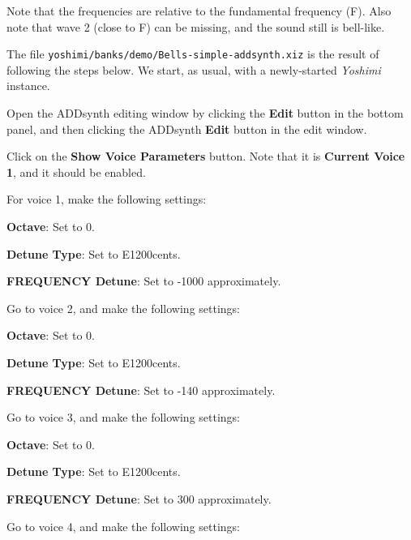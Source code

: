    Note that the frequencies are relative to the fundamental frequency (F).
   Also note that wave 2 (close to F) can be missing, and the sound still is
   bell-like.

   The file \texttt{yoshimi/banks/demo/Bells-simple-addsynth.xiz} is the
   result of following the steps below.  We start, as usual, with a
   newly-started \textsl{Yoshimi} instance.

   \begin{enumber}
      \item Open the ADDsynth editing window by clicking the \textbf{Edit}
         button in the bottom panel, and then clicking the ADDsynth
         \textbf{Edit} button in the edit window.
      \item Click on the \textbf{Show Voice Parameters} button.
         Note that it is \textbf{Current Voice 1}, and it should be enabled.
      \item For voice 1, make the following settings:
         \begin{enumber}
            \item \textbf{Octave}: Set to 0.
            \item \textbf{Detune Type}: Set to E1200cents.
            \item \textbf{FREQUENCY Detune}: Set to -1000 approximately.
         \end{enumber}
      \item Go to voice 2, and make the following settings:
         \begin{enumber}
            \item \textbf{Octave}: Set to 0.
            \item \textbf{Detune Type}: Set to E1200cents.
            \item \textbf{FREQUENCY Detune}: Set to -140 approximately.
         \end{enumber}
      \item Go to voice 3, and make the following settings:
         \begin{enumber}
            \item \textbf{Octave}: Set to 0.
            \item \textbf{Detune Type}: Set to E1200cents.
            \item \textbf{FREQUENCY Detune}: Set to 300 approximately.
         \end{enumber}
      \item Go to voice 4, and make the following settings:

\end{enumber}
